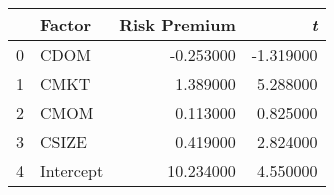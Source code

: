 \begin{tabular}{llrr}
\toprule
 & Factor & Risk Premium & \emph{t} \\
\midrule
0 & CDOM & -0.253000 & -1.319000 \\
1 & CMKT & 1.389000 & 5.288000 \\
2 & CMOM & 0.113000 & 0.825000 \\
3 & CSIZE & 0.419000 & 2.824000 \\
4 & Intercept & 10.234000 & 4.550000 \\
\bottomrule
\end{tabular}
